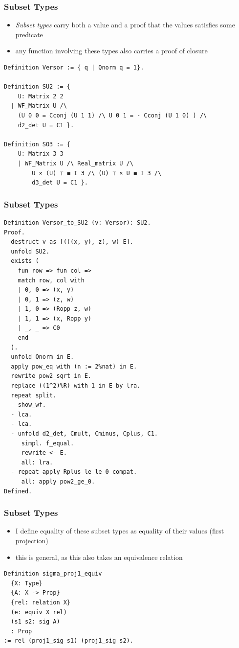 \documentclass{beamer}
\begin{document}
\begin{frame}[fragile]
\frametitle{Subset Types}

\begin{itemize}
	\item \textit{Subset types} carry both a value and a proof that the values satisfies some predicate
	\item any function involving these types also carries a proof of closure
\end{itemize}

\begin{lstlisting}[language=Coq]
Definition Versor := { q | Qnorm q = 1}.

Definition SU2 := { 
	U: Matrix 2 2
  | WF_Matrix U /\                                                                               
    (U 0 0 = Cconj (U 1 1) /\ U 0 1 = - Cconj (U 1 0) ) /\
    d2_det U = C1 }.

Definition SO3 := { 
	U: Matrix 3 3 
	| WF_Matrix U /\ Real_matrix U /\ 
		U × (U) ⊤ ≡ I 3 /\ (U) ⊤ × U ≡ I 3 /\ 
		d3_det U = C1 }. 
\end{lstlisting}
\end{frame}

\begin{frame}[fragile]
\frametitle{Subset Types}
\begin{lstlisting}[language=Coq, basicstyle=\tiny]
Definition Versor_to_SU2 (v: Versor): SU2.    
Proof.    
  destruct v as [(((x, y), z), w) E].    
  unfold SU2.    
  exists (    
    fun row => fun col =>    
    match row, col with    
    | 0, 0 => (x, y)    
    | 0, 1 => (z, w)    
    | 1, 0 => (Ropp z, w)    
    | 1, 1 => (x, Ropp y)    
    | _, _ => C0    
    end    
  ).    
  unfold Qnorm in E.    
  apply pow_eq with (n := 2%nat) in E.    
  rewrite pow2_sqrt in E.    
  replace ((1^2)%R) with 1 in E by lra.    
  repeat split.    
  - show_wf.    
  - lca.    
  - lca.    
  - unfold d2_det, Cmult, Cminus, Cplus, C1.    
     simpl. f_equal.    
     rewrite <- E.    
     all: lra.    
  - repeat apply Rplus_le_le_0_compat.    
     all: apply pow2_ge_0.    
Defined.
\end{lstlisting}
\end{frame}


\begin{frame}[fragile]
\frametitle{Subset Types}
\begin{itemize}
	\item I define equality of these subset types as equality of their values (first projection)
	\item this is general, as this also takes an equivalence relation
\end{itemize}

\begin{lstlisting}[language=Coq]
Definition sigma_proj1_equiv     
  {X: Type}     
  {A: X -> Prop}     
  {rel: relation X}    
  (e: equiv X rel)    
  (s1 s2: sig A)     
  : Prop     
:= rel (proj1_sig s1) (proj1_sig s2).
\end{lstlisting}
\end{frame}
\end{document}
